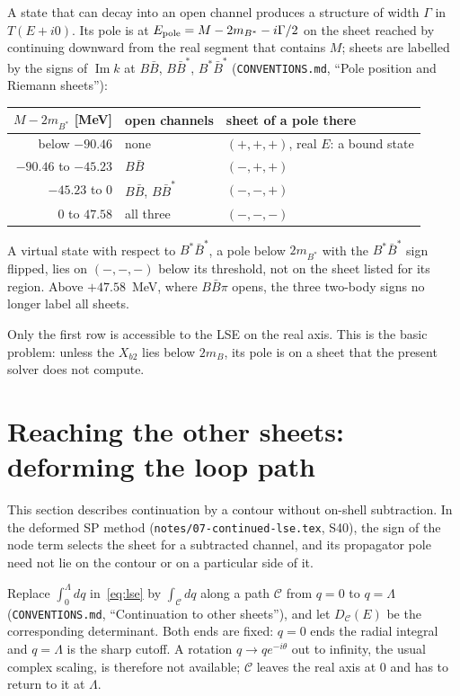 \documentclass[11pt]{article}
\newcommand{\file}[1]{\nolinkurl{#1}}
\begin{document}
A state that can decay into an open channel produces a structure of width $\Gamma$ in $T(E+i0)$. Its pole is at $E_{\rm pole}=M-2m_{B^*}-i\Gamma/2$ on the sheet reached by continuing downward from the real segment that contains $M$; sheets are labelled by the signs of $\operatorname{Im}k$ at $B\bar B$, $B\bar B^*$, $B^*\bar B^*$ (\file{CONVENTIONS.md}, ``Pole position and Riemann sheets''):
\begin{center}
\begin{tabular}{rll}
\toprule
$M-2m_{B^*}$ [MeV] & open channels & sheet of a pole there\\
\midrule
below $-90.46$ & none & $(+,+,+)$, real $E$: a bound state\\
$-90.46$ to $-45.23$ & $B\bar B$ & $(-,+,+)$\\
$-45.23$ to $0$ & $B\bar B$, $B\bar B^*$ & $(-,-,+)$\\
$0$ to $47.58$ & all three & $(-,-,-)$\\
\bottomrule
\end{tabular}
\end{center}
A virtual state with respect to $B^*\bar B^*$, a pole below $2m_{B^*}$ with the $B^*\bar B^*$ sign flipped, lies on $(-,-,-)$ below its threshold, not on the sheet listed for its region. Above $+47.58$~MeV, where $B\bar B\pi$ opens, the three two-body signs no longer label all sheets.

Only the first row is accessible to the LSE on the real axis. This is the basic problem: unless the $X_{b2}$ lies below $2m_B$, its pole is on a sheet that the present solver does not compute.

\section{Reaching the other sheets: deforming the loop path}\label{sec:contour}

This section describes continuation by a contour without on-shell subtraction. In the deformed SP method (\file{notes/07-continued-lse.tex}, S40), the sign of the node term selects the sheet for a subtracted channel, and its propagator pole need not lie on the contour or on a particular side of it.

Replace $\int_0^\Lambda dq$ in~\eqref{eq:lse} by $\int_{\mathcal C}dq$ along a path $\mathcal C$ from $q=0$ to $q=\Lambda$ (\file{CONVENTIONS.md}, ``Continuation to other sheets''), and let $D_{\mathcal C}(E)$ be the corresponding determinant. Both ends are fixed: $q=0$ ends the radial integral and $q=\Lambda$ is the sharp cutoff. A rotation $q\to qe^{-i\theta}$ out to infinity, the usual complex scaling, is therefore not available; $\mathcal C$ leaves the real axis at $0$ and has to return to it at $\Lambda$.
\end{document}
